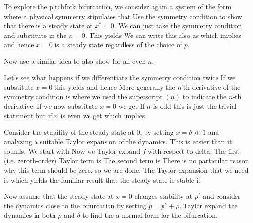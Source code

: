 To explore the pitchfork bifurcation, we consider again a system of the form 
where a physical symmetry stipulates that 
\subquestion Use the symmetry condition to show that there is a steady state at $x^*=0$. 
\solution
We can just take the symmetry condition and substitute in the $x=0$. This yields 
We can write this also as 
which implies 
and hence $x=0$ is a steady state regardless of the choice of $p$.

\subquestion
Now use a similar idea to also show 
for all even $n$.

\solution 
Let's see what happens if we differentiate the symmetry condition twice
If we substitute $x=0$ this yields
and hence 
More generally the $n$'th derivative of the symmetry condition is 
where we used the superscript $(n)$ to indicate the $n$-th derivative. 
If we now substitute $x=0$ we get 
If $n$ is odd this is just the trivial statement 
but if $n$ is even we get 
which implies 

\subquestion
Consider the stability of the steady state at $0$, by setting $x=\delta\ll 1$ and analyzing a suitable Taylor expansion of the dynamics. 
\solution 
This is easier than it sounds. We start with 
Now we Taylor expand $f$ with respect to delta. The first (i.e. zeroth-order) Taylor term is
The second term is 
There is no particular reason why this term should be zero, so we are done. The Taylor expansion that we need is 
which yields the familiar result that the steady state is stable if 

\subquestion
Now assume that the steady state at $x=0$ changes stability at $p^*$ and consider the dynamics close to the bifurcation by setting $p=p^*+\rho$. Taylor expand the dynamics in both $\rho$ and $\delta$ to find the a normal form for the bifurcation. 

